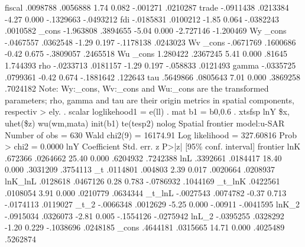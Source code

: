       fiscal {\VBAR}   .0098788   .0056888     1.74   0.082     -.001271    .0210287
       trade {\VBAR}  -.0911438   .0213384    -4.27   0.000    -.1329663   -.0493212
         fdi {\VBAR}  -.0185831   .0100212    -1.85   0.064    -.0382243    .0010582
       _cons {\VBAR}  -1.963808   .3894655    -5.04   0.000    -2.727146   -1.200469
Wy           {\VBAR}
       _cons {\VBAR}  -.0467557   .0362548    -1.29   0.197    -.1178138    .0243023
Wv           {\VBAR}
       _cons {\VBAR}  -.0671769   .1600686    -0.42   0.675    -.3809057    .2465518
Wu           {\VBAR}
       _cons {\VBAR}   1.280422   .2367245     5.41   0.000       .81645    1.744393
         rho {\VBAR}  -.0233713   .0181157    -1.29   0.197     -.058833    .0121493
       gamma {\VBAR}  -.0335725   .0799361    -0.42   0.674    -.1881642     .122643
         tau {\VBAR}   .5649866   .0805643     7.01   0.000     .3869258    .7024182
Note: Wy:_cons, Wv:_cons and Wu:_cons are the transformed parameters;
      rho, gamma and tau are their origin metrics in spatial components, respectiv
> ely.
{\smallskip}
. scalar loglikehood1 =  e(ll)
{\smallskip}
. mat b1 = b0,0.6
{\smallskip}
. xtsfsp lnY \$x, uhet(\$z)  wu(wm,mata)  init(b1) te(tesp2)  nolog
{\smallskip}
Spatial frontier model:u-SAR                          Number of obs =      630
                                                      Wald chi2(9)  = 16174.91
Log likelihood = 327.60816                            Prob > chi2   =   0.0000
{\smallskip}
         lnY {\VBAR} Coefficient  Std. err.      z    P>|z|     [95\% conf. interval]
frontier     {\VBAR}
         lnK {\VBAR}    .672366   .0264662    25.40   0.000     .6204932    .7242388
         lnL {\VBAR}   .3392661   .0184417    18.40   0.000     .3031209    .3754113
          _t {\VBAR}   .0114801    .004803     2.39   0.017     .0020664    .0208937
     lnK_lnL {\VBAR}   .0128618   .0467126     0.28   0.783    -.0786932    .1044169
      _t_lnK {\VBAR}   .0422561   .0108054     3.91   0.000     .0210779    .0634344
      _t_lnL {\VBAR}  -.0027543   .0074782    -0.37   0.713    -.0174113    .0119027
        _t_2 {\VBAR}  -.0066348   .0012629    -5.25   0.000      -.00911   -.0041595
       lnK_2 {\VBAR}  -.0915034   .0326073    -2.81   0.005    -.1554126   -.0275942
       lnL_2 {\VBAR}  -.0395255   .0328292    -1.20   0.229    -.1038696    .0248185
       _cons {\VBAR}   .4644181   .0315665    14.71   0.000     .4025489    .5262874
